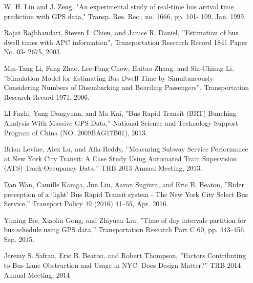 \documentclass[12pt,journal,compsoc]{IEEEtran}
\begin{document}

%
%
%
\begin{thebibliography}{14}

W. H. Lin and J. Zeng, "An experimental study of real-time bus arrival time prediction with GPS data," Transp. Res. Rec., no. 1666, pp. 101- 109, Jan. 1999.

Rajat Rajbhandari, Steven I. Chien, and Janice R. Daniel, ''Estimation of bus dwell times with APC information'', Transportation Research Record 1841 Paper No. 03- 2675, 2003.

Min-Tang Li, Fang Zhao, Lee-Fang Chow, Haitao Zhang, and Shi-Chiang Li, ''Simulation Model for Estimating Bus Dwell Time by Simultaneously Considering Numbers of Disembarking and Boarding Passengers'', Transportation Research Record 1971, 2006.

LI Fazhi, Yang Dongyuan, and Ma Kai, ''Bus Rapid Transit (BRT) Bunching Analysis With Massive GPS Data,'' National Science and Technology Support Program of China (NO. 2009BAG17B01), 2013.

Brian Levine, Alex Lu, and Alla Reddy, ''Measuring Subway Service Performance at New York City Transit: A Case Study Using Automated Train Supervision (ATS) Track-Occupancy Data,'' TRB 2013 Annual Meeting, 2013.

Dan Wan, Camille Kamga, Jun Liu, Aaron Sugiura, and Eric B. Beaton, ''Rider perception of a ‘light' Bus Rapid Transit system - The New York City Select Bus Service,'' Transport Policy 49 (2016) 41–55, Apr. 2016.


Yiming Bie, Xiaolin Gong, and Zhiyuan Liu, ''Time of day intervals partition for bus schedule using GPS data,'' Transportation Research Part C 60, pp. 443–456, Sep. 2015.

Jeremy S. Safran, Eric B. Beaton, and Robert Thompson, ''Factors Contributing to Bus Lane Obstruction and Usage in NYC: Does Design Matter?'' TRB 2014 Annual Meeting, 2014


\end{thebibliography}
\end{document}
